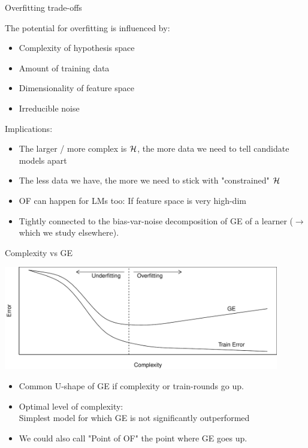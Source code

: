 \documentclass[11pt,compress,t,notes=noshow, xcolor=table]{beamer}
\begin{document}
\begin{vbframe}{Overfitting trade-offs}

The potential for overfitting is influenced by:
\begin{itemize}
  \item Complexity of hypothesis space
  \item Amount of training data
  \item Dimensionality of feature space
  \item Irreducible noise 
\end{itemize}
\lz
Implications:
\begin{itemize}
\item The larger / more complex is $\mathcal{H}$, 
    the more data we need to tell candidate models apart
\item The less data we have, the more we need to stick with "constrained" $\mathcal{H}$
\item OF can happen for LMs too: If feature space is very high-dim
\item Tightly connected to the bias-var-noise decomposition of GE
of a learner ($\rightarrow$ which we study elsewhere).
\end{itemize}
\end{vbframe}


\begin{vbframe}{Complexity vs GE}

\begin{center}
\includegraphics[width = 0.9\textwidth]{figure/eval_ofit_3} 
\end{center}


\vfill

\begin{itemize}
\item Common U-shape of GE if complexity or train-rounds go up.
\item Optimal level of complexity:\\
    Simplest model for which GE is not significantly outperformed
\item We could also call "Point of OF" the point where GE goes up. 
\end{itemize}

\end{vbframe}
\end{document}

